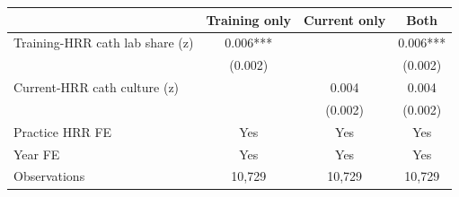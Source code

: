 
\begin{tabular}{lccc}
\toprule
 & Training only & Current only & Both\\
\midrule
Training-HRR cath lab share (z) & 0.006*** &  & 0.006***\\
 & (0.002) &  & (0.002)\\
Current-HRR cath culture (z) &  & 0.004 & 0.004\\
 &  & (0.002) & (0.002)\\
\midrule
Practice HRR FE & Yes & Yes & Yes\\
Year FE & Yes & Yes & Yes\\
Observations & 10,729 & 10,729 & 10,729\\
\bottomrule
\end{tabular}
